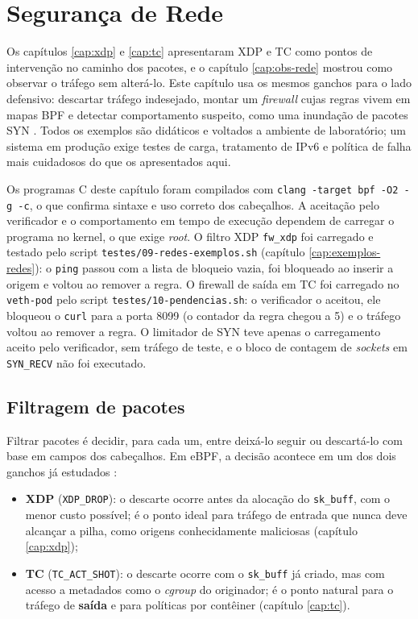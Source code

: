 \chapter{Segurança de Rede}
\label{cap:seguranca-rede}

Os capítulos \ref{cap:xdp} e \ref{cap:tc} apresentaram XDP e TC como pontos de
intervenção no caminho dos pacotes, e o capítulo \ref{cap:obs-rede} mostrou como
observar o tráfego sem alterá-lo. Este capítulo usa os mesmos ganchos para o lado
defensivo: descartar tráfego indesejado, montar um \textit{firewall} cujas regras
vivem em mapas BPF e detectar comportamento suspeito, como uma inundação de pacotes
SYN \cite{linuxkernel2024, gregg2019}. Todos os exemplos são didáticos e voltados a
ambiente de laboratório; um sistema em produção exige testes de carga, tratamento de
IPv6 e política de falha mais cuidadosos do que os apresentados aqui.

Os programas C deste capítulo foram compilados com
\texttt{clang -target bpf -O2 -g -c}, o que confirma sintaxe e uso correto dos
cabeçalhos. A aceitação pelo verificador e o comportamento em tempo de execução
dependem de carregar o programa no kernel, o que exige \textit{root}. O filtro XDP
\texttt{fw\_xdp} foi carregado e testado pelo script
\texttt{testes/09-redes-exemplos.sh} (capítulo \ref{cap:exemplos-redes}): o \texttt{ping}
passou com a lista de bloqueio vazia, foi bloqueado ao inserir a origem e voltou ao
remover a regra. O firewall de saída em TC foi carregado no \texttt{veth-pod} pelo
script \texttt{testes/10-pendencias.sh}: o verificador o aceitou, ele bloqueou o
\texttt{curl} para a porta 8099 (o contador da regra chegou a 5) e o tráfego voltou ao
remover a regra. O limitador de SYN teve apenas o carregamento aceito pelo
verificador, sem tráfego de teste, e o bloco de contagem de \textit{sockets} em
\texttt{SYN\_RECV} não foi executado.

\section{Filtragem de pacotes}

Filtrar pacotes é decidir, para cada um, entre deixá-lo seguir ou descartá-lo com base
em campos dos cabeçalhos. Em eBPF, a decisão acontece em um dos dois ganchos já
estudados \cite{linuxkernel2024}:

\begin{itemize}
  \item \textbf{XDP} (\texttt{XDP\_DROP}): o descarte ocorre antes da alocação do
        \texttt{sk\_buff}, com o menor custo possível; é o ponto ideal para
        tráfego de entrada que nunca deve alcançar a pilha, como origens
        conhecidamente maliciosas (capítulo \ref{cap:xdp});
  \item \textbf{TC} (\texttt{TC\_ACT\_SHOT}): o descarte ocorre com o
        \texttt{sk\_buff} já criado, mas com acesso a metadados como o
        \textit{cgroup} do originador; é o ponto natural para o tráfego de
        \textbf{saída} e para políticas por contêiner (capítulo \ref{cap:tc}).
\end{itemize}

